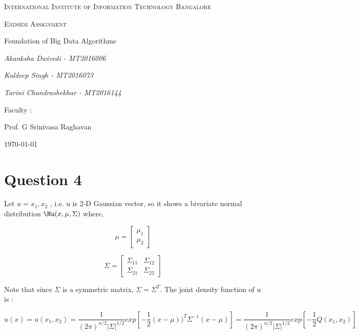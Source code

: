 \documentclass[12pt,a4paper]{article}
\begin{document}
\begin{titlepage}
	\centering
	{\scshape\LARGE International Institute of Information Technology Bangalore \par}
	\vspace{1cm}
	{\scshape\Large Endsem Assignment\par}
	{\Large Foundation of Big Data Algorithms\par}
	\vspace{1.5cm}
	{\Large\itshape Akanksha Dwivedi - MT2016006\par}
	{\Large\itshape Kuldeep Singh - MT2016073\par}
	{\Large\itshape Tarini Chandrashekhar - MT2016144\par}
	\vfill
	
	Faculty : \par
	Prof. G Srinivasa Raghavan

	\vfill

	{\large \today\par}
\end{titlepage}


\tableofcontents
\newpage
\section*{Question 4}
Let $u = {x_1,x_2}$ , i.e. u is 2-D Gaussian vector, so it shows a bivariate normal distribution $\Nu(x,\mu,\Sigma)$ where, 

\begin{equation*}
\mu = \begin{bmatrix}
\mu_1\\ 
\mu_2
\end{bmatrix}
\end{equation*}

\begin{equation*}
\Sigma = \begin{bmatrix}
\Sigma_{11} & \Sigma_{12} \\ 
\Sigma_{21} & \Sigma_{22} 
\end{bmatrix}
\end{equation*}

Note that since $\Sigma$ is a symmetric matrix, $\Sigma = \Sigma^T$.
The joint density function of u is :

\begin{equation*}
u(x) = u(x_1,x_2) = \frac{1}{(2\pi )^{n/2}|\Sigma|^{1/2}}exp[-\frac{1}{2}(x-\mu))^T\Sigma^{-1}(x-\mu)] =  \frac{1}{(2\pi )^{n/2}|\Sigma|^{1/2}}exp[-\frac{1}{2}Q(x_1,x_2)]
\end{equation*}
\end{document}
